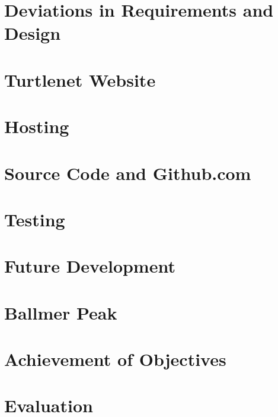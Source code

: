 \chapter{Deviations in Requirements and Design}


\chapter{Turtlenet Website}


\chapter{Hosting}


\chapter{Source Code and Github.com}


\chapter{Testing}


\chapter{Future Development}


\chapter{Ballmer Peak}


\chapter{Achievement of Objectives}


\chapter{Evaluation}
